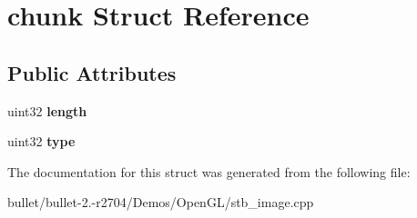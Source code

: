 \hypertarget{structchunk}{\section{chunk Struct Reference}
\label{structchunk}
}
\subsection*{Public Attributes}
\begin{DoxyCompactItemize}
\item 
\hypertarget{structchunk_a0b5cc0c5a9b91945c42373db2a499fb1}{uint32 {\bfseries length}}\label{structchunk_a0b5cc0c5a9b91945c42373db2a499fb1}

\item 
\hypertarget{structchunk_a05d5489f3807bc7ba149c1904241d087}{uint32 {\bfseries type}}\label{structchunk_a05d5489f3807bc7ba149c1904241d087}

\end{DoxyCompactItemize}


The documentation for this struct was generated from the following file\+:\begin{DoxyCompactItemize}
\item 
bullet/bullet-\/2.-\/r2704/\+Demos/\+Open\+G\+L/stb\+\_\+image.\+cpp\end{DoxyCompactItemize}
